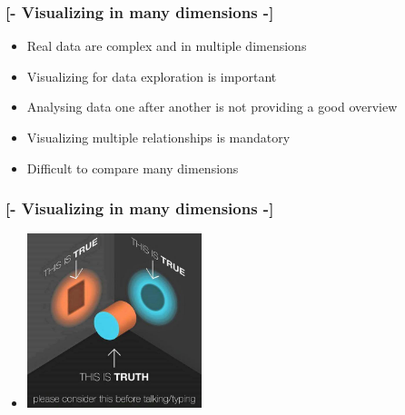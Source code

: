 \documentclass[xcolor=x11names,compress, aspectratio=169]{beamer}
\renewcommand{\(}{\begin{columns}}
\renewcommand{\)}{\end{columns}}
\newcommand{\<}[1]{\begin{column}{#1}}
\renewcommand{\>}{\end{column}}
\begin{document}
\begin{frame}
\begin{center}
\begin{itemize}
\end{itemize}
\end{center}
\end{frame}


\begin{frame}
\frametitle{\textcolor{brique}{[- \textbf{Visualizing in many dimensions} -]}}
\begin{center}
\begin{itemize}
   \item<+-> Real data are complex and in multiple dimensions
   \item<+-> Visualizing for data exploration is important %
   \item<+-> Analysing data one after another is not providing a good overview
   \item<+-> Visualizing multiple relationships is mandatory
   \item<+->  Difficult to compare many dimensions
\end{itemize}
\end{center}
\end{frame}

\begin{frame}
\frametitle{\textcolor{brique}{[- \textbf{Visualizing in many dimensions} -]}}
\begin{center}
\begin{itemize}
   \item<+->[]\includegraphics[width=0.4\textwidth]{TrueAndTrue.jpg}
\end{itemize}
\end{center}
\end{frame}
\end{document}
